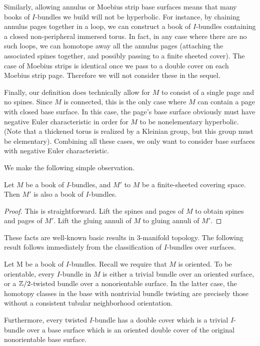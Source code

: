 Similarly, allowing annulus or Moebius strip base surfaces means that many
books of $I$-bundles we build will not be hyperbolic. For instance, by chaining
annulus pages together in a loop, we can construct a book of $I$-bundles
containing a closed non-peripheral immersed torus. In fact, in any case where
there are no such loops, we can homotope away all the annulus pages (attaching
the associated spines together, and possibly passing to a finite sheeted
cover).  The case of Moebius strips is identical once we pass to a double cover
on each Moebius strip page. Therefore we will not consider these in the sequel.

Finally, our definition does technically allow for $M$ to consist of a single
page and no spines. Since $M$ is connected, this is the only case where $M$ can
contain a page with closed base surface. In this case, the page's base surface
obviously must have negative Euler characteristic in order for $M$ to be
nonelementary hyperbolic. (Note that a thickened torus is realized by
a Kleinian group, but this group must be elementary). Combining all these
cases, we only want to consider base surfaces with negative Euler
characteristic.

We make the following simple observation.

\begin{prop}

Let $M$ be a book of $I$-bundles, and $M'$ to $M$ be a finite-sheeted covering
space.  Then $M'$ is also a book of $I$-bundles.

\end{prop}

\begin{proof}

This is straightforward. Lift the spines and pages of $M$ to obtain spines and
pages of $M'$. Lift the gluing annuli of $M$ to gluing annuli of $M'$.

\end{proof}

These facts are well-known basic results in $3$-manifold topology.  The
following result follows immediately from the classification of $I$-bundles
over surfaces.

\begin{prop}

Let M be a book of $I$-bundles. Recall we require that $M$ is oriented. To be
orientable, every $I$-bundle in $M$ is either a trivial bundle over an oriented
surface, or a $\mathbb{Z}/2$-twisted bundle over a nonorientable surface. In the
latter case, the homotopy classes in the base with nontrivial bundle twisting
are precisely those without a consistent tubular neighborhood orientation.

Furthermore, every twisted $I$-bundle has a double cover which is a trivial
$I$-bundle over a base surface which is an oriented double cover of the
original nonorientable base surface.

\end{prop}

